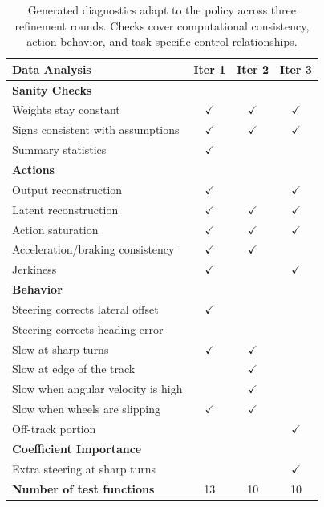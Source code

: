 \begin{table}[!t]
\small
\centering
\begin{tabular}{l|c|c|c}
\toprule
\textbf{Data Analysis} & \textbf{Iter 1} & \textbf{Iter 2} & \textbf{Iter 3} \\
\midrule
\multicolumn{4}{l}{\textbf{Sanity Checks}} \\
\midrule
Weights stay constant & $\checkmark$ & $\checkmark$ & $\checkmark$ \\
Signs consistent with assumptions & $\checkmark$ & $\checkmark$ & $\checkmark$ \\
Summary statistics & $\checkmark$ &   & \\
\midrule
\multicolumn{4}{l}{\textbf{Actions}} \\
\midrule
Output reconstruction & $\checkmark$ &  & $\checkmark$ \\
Latent reconstruction & $\checkmark$ & $\checkmark$ & $\checkmark$ \\
Action saturation & $\checkmark$ & $\checkmark$ & $\checkmark$ \\
Acceleration/braking consistency & $\checkmark$ & $\checkmark$ &  \\
Jerkiness & $\checkmark$ &  & $\checkmark$ \\
\midrule
\multicolumn{4}{l}{\textbf{Behavior}} \\
\midrule
Steering corrects lateral offset & $\checkmark$ &   & \\
Steering corrects heading error &  &   & \\
Slow at sharp turns & $\checkmark$ & $\checkmark$  & \\
Slow at edge of the track &  & $\checkmark$  & \\
Slow when angular velocity is high &  & $\checkmark$  & \\
Slow when wheels are slipping & $\checkmark$ & $\checkmark$  & \\
Off-track portion &  &  & $\checkmark$ \\
\midrule
\multicolumn{4}{l}{\textbf{Coefficient Importance}} \\
\midrule
Extra steering at sharp turns &  &  & $\checkmark$ \\
\midrule
\textbf{Number of test functions} & 13 & 10 & 10 \\
\bottomrule
\end{tabular}
\caption{Generated diagnostics adapt to the policy across three refinement rounds.
Checks cover computational consistency, action behavior, and task-specific control relationships.}
\label{tab:test-coverage}
\end{table}
